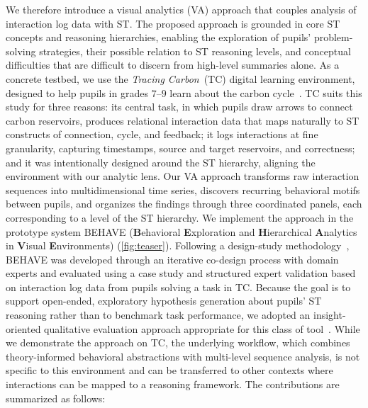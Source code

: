 \documentclass[letterpaper,journal]{IEEEtran}
\begin{document}
We therefore introduce a visual analytics (VA) approach that couples analysis of interaction log data with ST. 
The proposed approach is grounded in core ST concepts and reasoning hierarchies, enabling the exploration of pupils' problem-solving strategies, their possible relation to ST reasoning levels, and conceptual difficulties that are difficult to discern from high-level summaries alone.
As a concrete testbed, we use the \textit{Tracing Carbon}~(TC) digital learning environment, designed to help pupils in grades $7$--$9$ learn about the carbon cycle~\cite{mani2026designing}. 
TC suits this study for three reasons: its central task, in which pupils draw arrows to connect carbon reservoirs, produces relational interaction data that maps naturally to ST constructs of connection, cycle, and feedback; it logs interactions at fine granularity, capturing timestamps, source and target reservoirs, and correctness; and it was intentionally designed around the ST hierarchy, aligning the environment with our analytic lens.
Our VA approach transforms raw interaction sequences into multidimensional time series, discovers recurring behavioral motifs between pupils, and organizes the findings through three coordinated panels, each corresponding to a level of the ST hierarchy.
We implement the approach in the prototype system \textsc{BEHAVE} (\textbf{B}ehavioral \textbf{E}xploration and \textbf{H}ierarchical \textbf{A}nalytics in \textbf{V}isual \textbf{E}nvironments) (\cref{fig:teaser}).
Following a design-study methodology~\cite{sedlmair2012design}, \textsc{BEHAVE} was developed through an iterative co-design process with domain experts and evaluated using a case study and structured expert validation based on interaction log data from pupils solving a task in TC.
Because the goal is to support open-ended, exploratory hypothesis generation about pupils' ST reasoning rather than to benchmark task performance, we adopted an insight-oriented qualitative evaluation approach appropriate for this class of tool~\cite{lam2012empirical}.
While we demonstrate the approach on TC, the underlying workflow, which combines theory-informed behavioral abstractions with multi-level sequence analysis, is not specific to this environment and can be transferred to other contexts where interactions can be mapped to a reasoning framework.
The contributions are summarized as follows:
\end{document}
